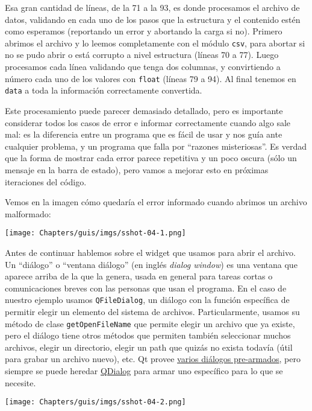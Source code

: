Esa gran cantidad de líneas, de la 71 a la 93, es donde procesamos el archivo de datos, validando en cada uno de los pasos que la estructura y el contenido estén como esperamos (reportando un error y abortando la carga si no). Primero abrimos el archivo y lo leemos completamente con el módulo \texttt{csv}, para abortar si no se pudo abrir o está corrupto a nivel estructura (líneas 70 a 77). Luego procesamos cada línea validando que tenga dos columnas, y convirtiendo a número cada uno de los valores con \texttt{float} (líneas 79 a 94). Al final tenemos en \texttt{data} a toda la información correctamente convertida.

Este procesamiento puede parecer demasiado detallado, pero es importante considerar todos los casos de error e informar correctamente cuando algo sale mal: es la diferencia entre un programa que es fácil de usar y nos guía ante cualquier problema, y un programa que falla por ``razones misteriosas''. Es verdad que la forma de mostrar cada error parece repetitiva y un poco oscura (sólo un mensaje en la barra de estado), pero vamos a mejorar esto en próximas iteraciones del código. 

Vemos en la imagen cómo quedaría el error informado cuando abrimos un archivo malformado:
\
\begin{center}
    \texttt{[image: Chapters/guis/imgs/sshot-04-1.png]}
\end{center}

Antes de continuar hablemos sobre el widget que usamos para abrir el archivo. Un ``diálogo'' o ``ventana diálogo'' (en inglés \textit{dialog window}) es una ventana que aparece arriba de la que la genera, usada en general para tareas cortas o comunicaciones breves con las personas que usan el programa. En el caso de nuestro ejemplo usamos \texttt{QFileDialog}, un diálogo con la función específica de permitir elegir un elemento del sistema de archivos. Particularmente, usamos su método de clase \texttt{getOpenFileName} que permite elegir un archivo que ya existe, pero el diálogo tiene otros métodos que permiten también seleccionar muchos archivos, elegir un directorio, elegir un path que quizás no exista todavía (útil para grabar un archivo nuevo), etc. Qt provee \href{https://doc.qt.io/qt-6/dialogs.html}{varios diálogos pre-armados}, pero siempre se puede heredar \href{https://doc.qt.io/qt-6/qdialog.html}{QDialog} para armar uno específico para lo que se necesite.

\begin{center}
    \texttt{[image: Chapters/guis/imgs/sshot-04-2.png]}
\end{center}

